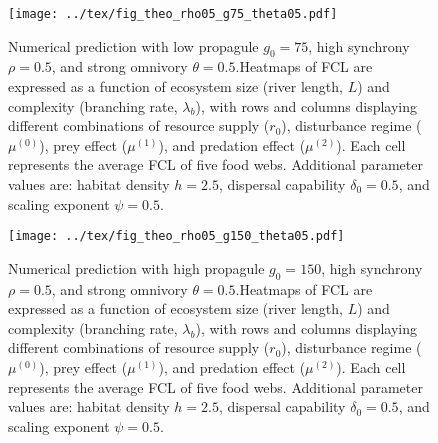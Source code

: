 \newpage

\begin{figure}
\centering
\texttt{[image: ../tex/fig\_theo\_rho05\_g75\_theta05.pdf]}
\caption{Numerical prediction with low propagule \(g_0 = 75\), high
synchrony \(\rho = 0.5\), and strong omnivory \(\theta = 0.5\).Heatmaps
of FCL are expressed as a function of ecosystem size (river length,
\(L\)) and complexity (branching rate, \(\lambda_b\)), with rows and
columns displaying different combinations of resource supply (\(r_0\)),
disturbance regime (\(\mu^{(0)}\)), prey effect (\(\mu^{(1)}\)), and
predation effect (\(\mu^{(2)}\)). Each cell represents the average FCL
of five food webs. Additional parameter values are: habitat density
\(h=2.5\), dispersal capability \(\delta_0=0.5\), and scaling exponent
\(\psi=0.5\).}
\end{figure}

\newpage

\begin{figure}
\centering
\texttt{[image: ../tex/fig\_theo\_rho05\_g150\_theta05.pdf]}
\caption{Numerical prediction with high propagule \(g_0 = 150\), high
synchrony \(\rho = 0.5\), and strong omnivory \(\theta = 0.5\).Heatmaps
of FCL are expressed as a function of ecosystem size (river length,
\(L\)) and complexity (branching rate, \(\lambda_b\)), with rows and
columns displaying different combinations of resource supply (\(r_0\)),
disturbance regime (\(\mu^{(0)}\)), prey effect (\(\mu^{(1)}\)), and
predation effect (\(\mu^{(2)}\)). Each cell represents the average FCL
of five food webs. Additional parameter values are: habitat density
\(h=2.5\), dispersal capability \(\delta_0=0.5\), and scaling exponent
\(\psi=0.5\).}
\end{figure}

\newpage
